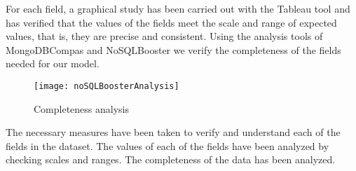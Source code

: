 For each field, a graphical study has been carried out with the Tableau tool and has verified that the values of the
fields meet the scale and range of expected values, that is, they are precise and consistent.
Using the analysis tools of MongoDBCompas and NoSQLBooster we verify the completeness of the fields needed for our model.
\begin{figure}[ht]
    \centering
    \texttt{[image: noSQLBoosterAnalysis]}
    \caption{Completeness analysis}
\end{figure}

\begin{itemize}
    \done The necessary measures have been taken to verify and understand each of the fields in the dataset.
    \done The values of each of the fields have been analyzed by checking scales and ranges.
    \done The completeness of the data has been analyzed.
    
\end{itemize}